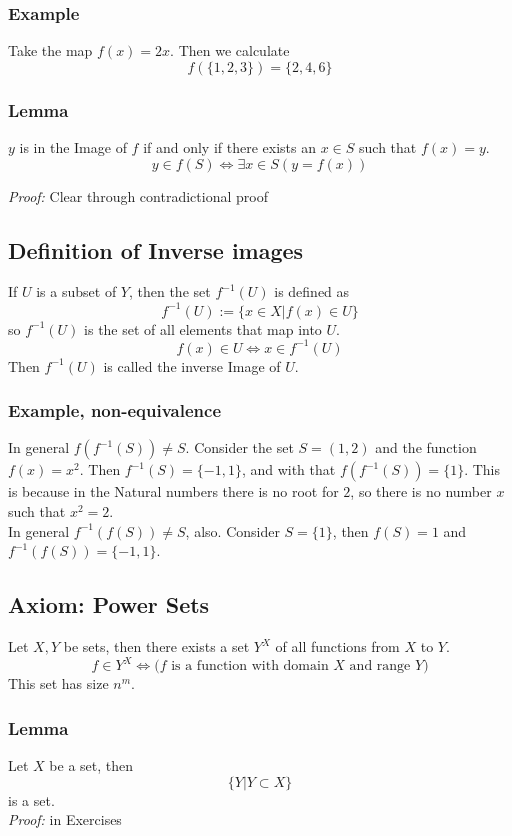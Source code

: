 \subsubsection*{Example}
Take the map $f(x)=2x$. Then we calculate
$$
f(\{1,2,3\}) = \{2,4,6\}
$$

\subsubsection*{Lemma}
$y$ is in the Image of $f$ if and only if there exists an $x\in S$ such that $f(x) = y$. 
$$
y\in f(S) \Longleftrightarrow \exists x\in S ( y = f(x) )
$$

\textit{Proof: } Clear through contradictional proof

\subsection{Definition of Inverse images}
If $U$ is a subset of $Y$, then the set $f^{-1}(U)$ is defined as
$$
f^{-1}(U) := \{x\in X | f(x)\in U \}
$$
so $f^{-1}(U)$ is the set of all elements that map into $U$.
$$
f(x)\in U \Longleftrightarrow x\in f^{-1}(U)
$$
Then $f^{-1}(U)$ is called the inverse Image of $U$.

\subsubsection{Example, non-equivalence}
In general $f(f^{-1}(S)) \neq S$. Consider the set $S = (1,2)$ and the function $f(x) = x^2$. Then $f^{-1}(S) = \{-1, 1\}$, and with that $f(f^{-1}(S)) = \{1\}$. This is because in the Natural numbers there is no root for $2$, so there is no number $x$ such that $x^2 = 2$.\\
In general $f^{-1}(f(S)) \neq S$, also. Consider $S = \{1\}$, then $f(S) = 1$ and $f^{-1}(f(S)) = \{-1,1\}$.

\subsection{Axiom: Power Sets}
Let $X,Y$ be sets, then there exists a set $Y^{X}$ of all functions from $X$ to $Y$.
$$
f\in Y^{X} \Leftrightarrow \text{($f$ is a function with domain $X$ and range $Y$)}
$$
This set has size $n^m$.

\subsubsection*{Lemma}
Let $X$ be a set, then
$$
\{Y | Y \subset X\}
$$
is a set.\\
\textit{Proof: }in Exercises

